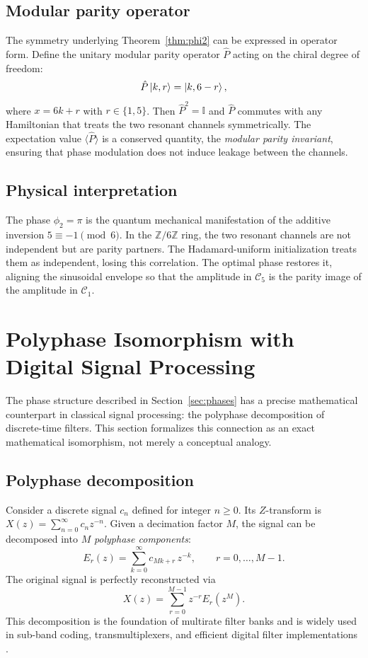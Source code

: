 \documentclass[12pt,a4paper]{article}
\theoremstyle{plain}
\theoremstyle{definition}
\theoremstyle{remark}
\begin{document}
\subsection{Modular parity operator}
The symmetry underlying Theorem~\ref{thm:phi2} can be expressed in operator form. Define the unitary modular parity operator \(\hat{P}\) acting on the chiral degree of freedom:
\begin{equation}
\hat{P} \ket{k, r} = \ket{k, 6-r},
\label{eq:P}
\end{equation}
where \(x = 6k + r\) with \(r \in \{1,5\}\). Then \(\hat{P}^2 = \mathbb{I}\) and \(\hat{P}\) commutes with any Hamiltonian that treats the two resonant channels symmetrically. The expectation value \(\langle \hat{P} \rangle\) is a conserved quantity, the \emph{modular parity invariant}, ensuring that phase modulation does not induce leakage between the channels.

\subsection{Physical interpretation}
The phase \(\phi_2 = \pi\) is the quantum mechanical manifestation of the additive inversion \(5 \equiv -1 \pmod{6}\). In the \(\mathbb{Z}/6\mathbb{Z}\) ring, the two resonant channels are not independent but are parity partners. The Hadamard-uniform initialization treats them as independent, losing this correlation. The optimal phase restores it, aligning the sinusoidal envelope so that the amplitude in \(\mathcal{C}_5\) is the parity image of the amplitude in \(\mathcal{C}_1\).

\section{Polyphase Isomorphism with Digital Signal Processing}
\label{sec:DSP}

The phase structure described in Section~\ref{sec:phases} has a precise mathematical counterpart in classical signal processing: the polyphase decomposition of discrete-time filters. This section formalizes this connection as an exact mathematical isomorphism, not merely a conceptual analogy.

\subsection{Polyphase decomposition}
Consider a discrete signal \(c_n\) defined for integer \(n \geq 0\). Its \(Z\)-transform is \(X(z) = \sum_{n=0}^{\infty} c_n z^{-n}\). Given a decimation factor \(M\), the signal can be decomposed into \(M\) \emph{polyphase components}:
\begin{equation}
E_r(z) = \sum_{k=0}^{\infty} c_{Mk + r} \, z^{-k}, \qquad r = 0, \dots, M-1.
\label{eq:polyphase}
\end{equation}
The original signal is perfectly reconstructed via
\begin{equation}
X(z) = \sum_{r=0}^{M-1} z^{-r} E_r(z^M).
\label{eq:reconstruction}
\end{equation}
This decomposition is the foundation of multirate filter banks and is widely used in sub-band coding, transmultiplexers, and efficient digital filter implementations \cite{vaidyanathan}.
\end{document}
